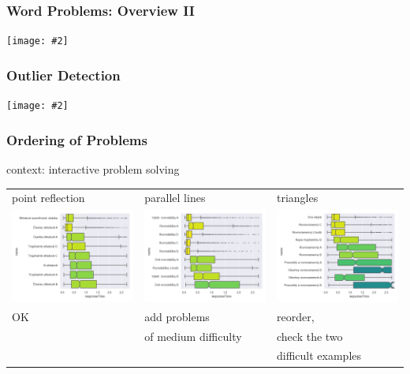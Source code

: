 \documentclass[bigger]{beamer}
\newcommand{\img}[2]{\begin{center}\texttt{[image: \#2]}\end{center}}
\begin{document}
\begin{frame}
  \frametitle{Word Problems: Overview II}

  \img{.9}{wp-overview-2}
\end{frame}

\begin{frame}
  \frametitle{Outlier Detection}

  \img{.9}{wp-mult}
\end{frame}

\begin{frame}
  \frametitle{Ordering of Problems}

  context: interactive problem solving

  \bigskip

  \begin{tabular}{lll}
    point reflection & parallel lines & triangles \\
    \includegraphics[width=.3\linewidth]{mrizkovana_stred} &
    \includegraphics[width=.3\linewidth]{mrizkovana_rovnobezky} &
                                                                  \includegraphics[width=.3\linewidth]{mrizkovana_triangles} \\
    OK & add problems  & reorder, \\
                     & of medium difficulty &  check the two \\
    & & difficult
                                             examples \\
  \end{tabular}
\end{frame}
\end{document}
